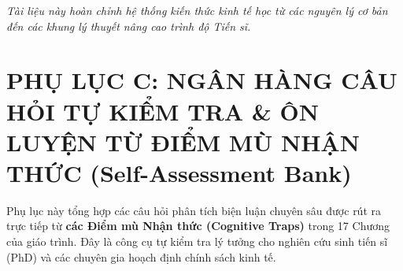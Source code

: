 \documentclass[
]{article}
\begin{document}
\emph{Tài liệu này hoàn chỉnh hệ thống kiến thức kinh tế học từ các
nguyên lý cơ bản đến các khung lý thuyết nâng cao trình độ Tiến sĩ.}

\section{PHỤ LỤC C: NGÂN HÀNG CÂU HỎI TỰ KIỂM TRA \& ÔN LUYỆN TỪ ĐIỂM MÙ
NHẬN THỨC (Self-Assessment
Bank)}\label{phux1ee5-lux1ee5c-c-nguxe2n-huxe0ng-cuxe2u-hux1ecfi-tux1ef1-kiux1ec3m-tra-uxf4n-luyux1ec7n-tux1eeb-ux111iux1ec3m-muxf9-nhux1eadn-thux1ee9c-self-assessment-bank}

Phụ lục này tổng hợp các câu hỏi phân tích biện luận chuyên sâu được rút
ra trực tiếp từ \textbf{các Điểm mù Nhận thức (Cognitive Traps)} trong
17 Chương của giáo trình. Đây là công cụ tự kiểm tra lý tưởng cho nghiên
cứu sinh tiến sĩ (PhD) và các chuyên gia hoạch định chính sách kinh tế.
\end{document}

